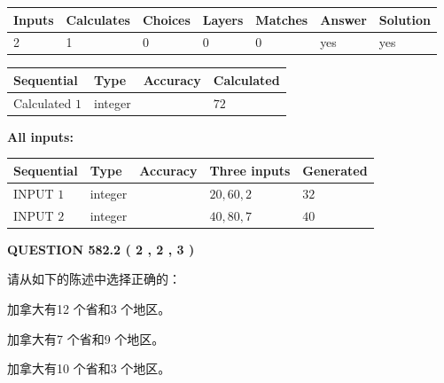 \documentclass{ctexart}
\begin{document}
   
\noindent\begin{tabular}{|l|l|l|l|l|l|l|}
 \hline
Inputs & Calculates & Choices & Layers & Matches & Answer & Solution \\ \hline
 2  & 
 1  & 
 0
  & 
 0  & 
 0  & 
  yes & 
  yes 
  \\ \hline
 \end{tabular}
   
   
   
   
\noindent{}
   
   
  
  
\noindent\begin{tabular}{|l|l|l|l|}
\hline
 Sequential & Type & Accuracy & Calculated \\ 
\hline
 
 
  Calculated $  1 $ & integer &  & 
  $ 72 $ 
 \\  \hline  
 \end{tabular}
   
   
   
   
\noindent\vspace{0.1in}\hspace{-0.08in} {\textbf{\Large{All inputs: }}}
   
   
  
  
\noindent\begin{tabular}{|l|l|l|l|l|}
\hline
 Sequential & Type & Accuracy & Three inputs & Generated \\ 
\hline
 
 
  INPUT $  1 $ & integer &  & $
 20
 , 
 60
 , 
 2
 $ & $ 32 $ 
 \\  \hline  
 
 
  INPUT $  2 $ & integer &  & $
 40
 , 
 80
 , 
 7
 $ & $ 40 $ 
 \\  \hline  
 \end{tabular}
   
   
  
\vspace{0.2in}
  
{\textbf{\Large{QUESTION
582.2 
 ( 2 , 2 , 3 )
}}}
  
  
请从如下的陈述中选择正确的：
 
 
加拿大有12 个省和3 个地区。
 
 
加拿大有7 个省和9 个地区。
 
 
加拿大有10 个省和3 个地区。
 
\end{document}
